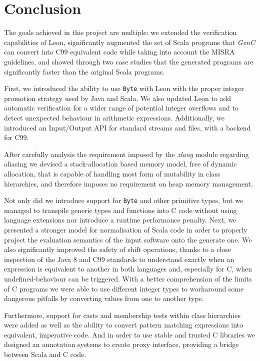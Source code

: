 \documentclass[a4paper,twoside]{article}
\newcommand{\Inline}[1]{\lstinline[basicstyle=\ttfamily]|#1|}
\let\oldsection\section
\renewcommand\section{\cleardoublepage\oldsection}
\newcommand{\GenC}{\emph{GenC}\xspace}
\begin{document}
\section{Conclusion}
\label{conclusion}

The goals achieved in this project are multiple: we extended the verification
capabilities of Leon, significantly augmented the set of Scala programs that
\GenC can convert into C99 equivalent code while taking into account the MISRA
guidelines, and showed through two case studies that the generated programs are
significantly faster than the original Scala programs.

First, we introduced the ability to use \Inline{Byte} with Leon with the proper
integer promotion strategy used by Java and Scala. We also updated Leon to add
automatic verification for a wider range of potential integer overflows and to
detect unexpected behaviour in arithmetic expressions. Additionally, we
introduced an Input/Output API for standard streams and files, with a backend
for C99.

After carefully analysis the requirement imposed by the \emph{xlang} module
regarding aliasing we devised a stack-allocation based memory model, free of
dynamic allocation, that is capable of handling most form of mutability in class
hierarchies, and therefore imposes no requirement on heap memory management.

Not only did we introduce support for \Inline{Byte} and other primitive types,
but we managed to transpile generic types and functions into C code without
using language extensions nor introduce a runtime performance penalty. Next, we
presented a stronger model for normalisation of Scala code in order to properly
project the evaluation semantics of the input software onto the generate one. We
also significantly improved the safety of shift operations, thanks to a close
inspection of the Java 8 and C99 standards to understand exactly when an
expression is equivalent to another in both languages and, especially for C,
when undefined-behaviour can be triggered. With a better comprehension of the
limits of C programs we were able to use different integer types to workaround
some dangerous pitfalls by converting values from one to another type.

Furthermore, support for casts and membership tests within class hierarchies
were added as well as the ability to convert pattern matching expressions into
equivalent, imperative code. And in order to use stable and trusted C libraries
we designed an annotation systems to create proxy interface, providing a bridge
between Scala and C code.
\end{document}
